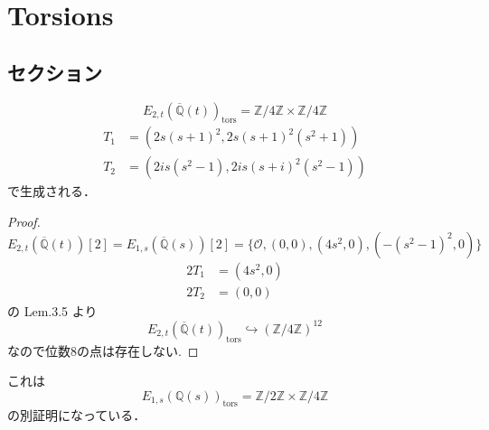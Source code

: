 \documentclass[main]{subfiles}
\begin{document}
\chapter{Torsions}

\section{セクション}

\begin{thm}
    \begin{equation}
        E_{2,t}(\overline{\mathbb{Q}}(t))_ \text{tors} = \mathbb{Z} / 4 \mathbb{Z} \times \mathbb{Z} / 4 \mathbb{Z}
    \end{equation}
    \begin{align}
        T_1 & = (2s(s+1)^2,2s(s+1)^2(s^2+1))    \\
        T_2 & = (2is(s^2-1),2is(s+i)^2(s^2-1))
    \end{align}
    で生成される．
\end{thm}
\begin{proof}
    \begin{equation}
        E_{2,t}(\overline{\mathbb{Q}}(t))[2] = E_{1,s}(\overline{\mathbb{Q}}(s))[2] = \{\mathcal{O}, (0,0), (4s^{2},0),( - (s^{2} - 1)^{2},0)\}
    \end{equation}
    \begin{align}
        2T_1 & = (4s^2,0) \\
        2T_2 & = (0,0)
    \end{align}
    \cite{ref:naskrecki2013} の Lem.3.5 より
    \begin{equation}
        E_{2,t}(\overline{\mathbb{Q}}(t))_ \text{tors} \hookrightarrow (\mathbb{Z} / 4 \mathbb{Z})^{12}
    \end{equation}
    なので位数8の点は存在しない.
\end{proof}

\begin{rem}
    これは
    \begin{equation}
        E_{1,s}(\mathbb{Q}(s))_ \text{tors} = \mathbb{Z} / 2 \mathbb{Z} \times \mathbb{Z} / 4 \mathbb{Z}
    \end{equation}
    の別証明になっている．
\end{rem}
\end{document}
